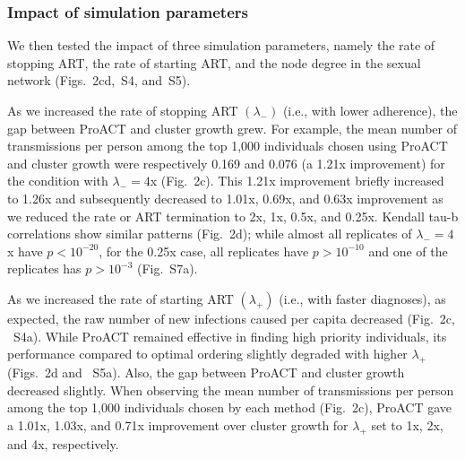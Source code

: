 \documentclass[a4paper,11pt]{article}
\begin{document}
\subsubsection{Impact of simulation parameters}
We then tested the impact of three simulation parameters, namely the rate of stopping ART, the rate of starting ART, and the node degree in the sexual network (Figs.~2cd,~S4, and~S5).

As we increased the rate of stopping ART $\left(\lambda_{-}\right)$ (i.e., with lower adherence), the gap between ProACT and cluster growth grew.
For example, the mean number of transmissions per person among the top 1,000 individuals chosen using ProACT and cluster growth were respectively 0.169 and 0.076 (a 1.21x improvement) for the condition with $\lambda_-=4$x (Fig.~2c). 
This 1.21x improvement briefly increased to 1.26x and subsequently decreased to 1.01x, 0.69x, and 0.63x improvement as we reduced the rate or ART termination to 2x, 1x, 0.5x, and 0.25x.
Kendall tau-b correlations show similar patterns (Fig.~2d);
while almost all replicates of $\lambda_-=4$x have $p<10^{-20}$, for the 0.25x case, all replicates have $p>10^{-10}$ and one of the replicates has $p>10^{-3}$  (Fig.~S7a).
    






As we increased the rate of starting ART $\left(\lambda_{+}\right)$ (i.e., with faster diagnoses), as expected, the raw number of new infections caused per capita  decreased (Fig.~2c, ~S4a).
While ProACT remained effective in finding high priority individuals,
its performance compared to optimal ordering slightly degraded with higher $\lambda_{+}$ (Figs.~2d and ~S5a).
Also, the gap between ProACT and cluster growth decreased slightly.
When observing the mean number of transmissions per person among the top 1,000 individuals chosen by each method (Fig.~2c),
ProACT gave a 1.01x, 1.03x, and 0.71x improvement over cluster growth for $\lambda_{+}$ set to 1x, 2x, and 4x, respectively.
\end{document}
